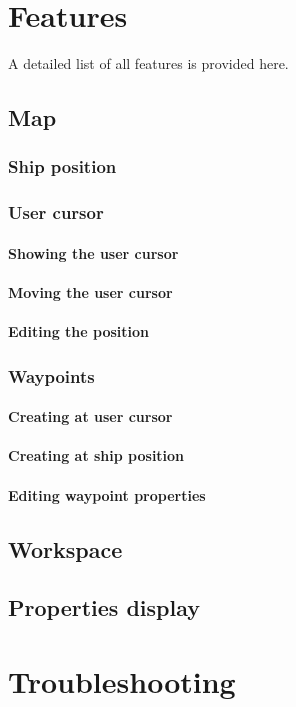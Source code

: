 \documentclass[12pt]{article}
\begin{document}
\section{Features}
A detailed list of all features is provided here.
\subsection{Map}
\subsubsection{Ship position}
\subsubsection{User cursor}
\paragraph{Showing the user cursor}
\paragraph{Moving the user cursor}
\paragraph{Editing the position}
\subsubsection{Waypoints}
\paragraph{Creating at user cursor}
\paragraph{Creating at ship position}
\paragraph{Editing waypoint properties}
\subsection{Workspace}
\subsection{Properties display}


\section{Troubleshooting}
\end{document}
